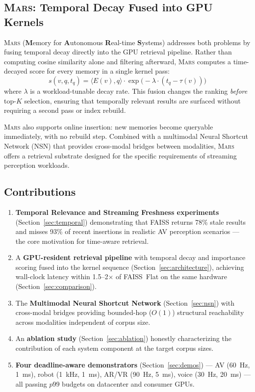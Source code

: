 \documentclass[11pt]{article}
\newcommand{\mars}{\textsc{Mars}}
\begin{document}
\subsection{\mars{}: Temporal Decay Fused into GPU Kernels}

\mars{} (\textbf{M}emory for \textbf{A}utonomous \textbf{R}eal-time
\textbf{S}ystems) addresses both problems by fusing temporal decay
directly into the GPU retrieval pipeline. Rather than computing cosine
similarity alone and filtering afterward, \mars{} computes a
time-decayed score for every memory in a single kernel pass:
\[
s(v, q, t_q) = \langle E(v), q \rangle \cdot
  \exp\!\bigl(-\lambda \cdot (t_q - \tau(v))\bigr)
\]
where $\lambda$ is a workload-tunable decay rate. This fusion changes
the ranking \emph{before} top-$K$ selection, ensuring that temporally
relevant results are surfaced without requiring a second pass or index
rebuild.

\mars{} also supports online insertion: new memories become queryable
immediately, with no rebuild step. Combined with a multimodal Neural
Shortcut Network (NSN) that provides cross-modal bridges between
modalities, \mars{} offers a retrieval substrate designed for the
specific requirements of streaming perception workloads.

\subsection{Contributions}

\begin{enumerate}
\item \textbf{Temporal Relevance and Streaming Freshness experiments}
  (Section~\ref{sec:temporal}) demonstrating that FAISS returns 78\%
  stale results and misses 93\% of recent insertions in realistic AV
  perception scenarios --- the core motivation for time-aware retrieval.

\item A \textbf{GPU-resident retrieval pipeline} with temporal decay
  and importance scoring fused into the kernel sequence
  (Section~\ref{sec:architecture}), achieving wall-clock latency within
  1.5--2$\times$ of FAISS~Flat on the same hardware
  (Section~\ref{sec:comparison}).

\item The \textbf{Multimodal Neural Shortcut Network}
  (Section~\ref{sec:nsn}) with cross-modal bridges providing
  bounded-hop ($O(1)$) structural reachability across modalities
  independent of corpus size.

\item An \textbf{ablation study} (Section~\ref{sec:ablation}) honestly
  characterizing the contribution of each system component at the
  target corpus sizes.

\item \textbf{Four deadline-aware demonstrators}
  (Section~\ref{sec:demos}) --- AV (60~Hz, 1~ms), robot (1~kHz, 1~ms),
  AR/VR (90~Hz, 5~ms), voice (30~Hz, 20~ms) --- all passing $p99$
  budgets on datacenter and consumer GPUs.
\end{enumerate}
\end{document}
